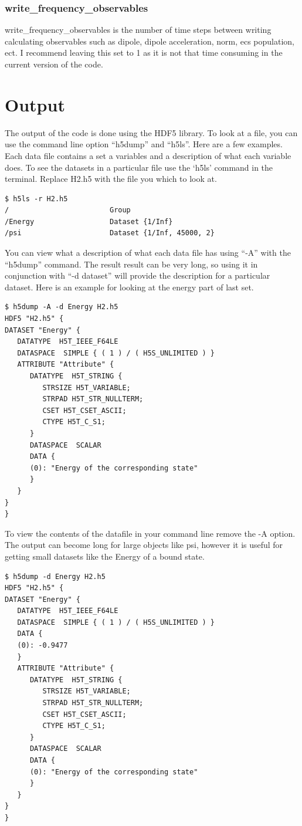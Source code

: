 \documentclass{article}
\begin{document}
\subsubsection{write\_frequency\_observables}
write\_frequency\_observables is the number of time steps between writing calculating observables such as dipole, dipole acceleration, norm, ecs population, ect. I recommend leaving this set to 1 as it is not that time consuming in the current version of the code.


\section{Output} %
\label{sec:output}
The output of the code is done using the HDF5 library. To look at a file, you can use the command line option ``h5dump'' and ``h5ls''. Here are a few examples. Each data file contains a set a variables and a description of what each variable does. To see the datasets in a particular file use the `h5ls' command in the terminal. Replace H2.h5 with the file you which to look at.
\begin{verbatim}
$ h5ls -r H2.h5
/                        Group
/Energy                  Dataset {1/Inf}
/psi                     Dataset {1/Inf, 45000, 2}
\end{verbatim}

You can view what a description of what each data file has using ``-A'' with the ``h5dump'' command. The result result can be very long, so using it in conjunction with ``-d dataset'' will provide the description for a particular dataset. Here is an example for looking at the energy part of last set.
\begin{verbatim}
$ h5dump -A -d Energy H2.h5
HDF5 "H2.h5" {
DATASET "Energy" {
   DATATYPE  H5T_IEEE_F64LE
   DATASPACE  SIMPLE { ( 1 ) / ( H5S_UNLIMITED ) }
   ATTRIBUTE "Attribute" {
      DATATYPE  H5T_STRING {
         STRSIZE H5T_VARIABLE;
         STRPAD H5T_STR_NULLTERM;
         CSET H5T_CSET_ASCII;
         CTYPE H5T_C_S1;
      }
      DATASPACE  SCALAR
      DATA {
      (0): "Energy of the corresponding state"
      }
   }
}
}
\end{verbatim}

To view the contents of the datafile in your command line remove the -A option. The output can become long for large objects like psi, however it is useful for getting small datasets like the Energy of a bound state.
\begin{verbatim}
$ h5dump -d Energy H2.h5
HDF5 "H2.h5" {
DATASET "Energy" {
   DATATYPE  H5T_IEEE_F64LE
   DATASPACE  SIMPLE { ( 1 ) / ( H5S_UNLIMITED ) }
   DATA {
   (0): -0.9477
   }
   ATTRIBUTE "Attribute" {
      DATATYPE  H5T_STRING {
         STRSIZE H5T_VARIABLE;
         STRPAD H5T_STR_NULLTERM;
         CSET H5T_CSET_ASCII;
         CTYPE H5T_C_S1;
      }
      DATASPACE  SCALAR
      DATA {
      (0): "Energy of the corresponding state"
      }
   }
}
}
\end{verbatim}
\end{document}
